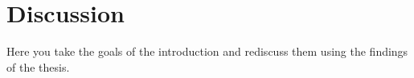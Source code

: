 \chapter{Discussion}
\label{sec:Discussion}

Here you take the goals of the introduction and rediscuss them using the findings of the thesis.
